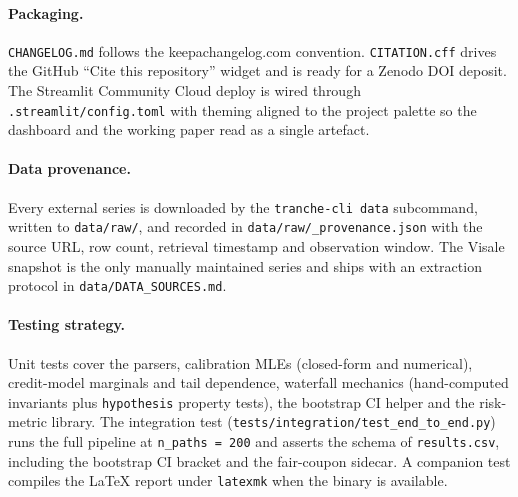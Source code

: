 \paragraph{Packaging.} \texttt{CHANGELOG.md} follows the
keepachangelog.com convention. \texttt{CITATION.cff} drives the GitHub
``Cite this repository'' widget and is ready for a Zenodo DOI deposit.
The Streamlit Community Cloud deploy is wired through
\texttt{.streamlit/config.toml} with theming aligned to the project
palette so the dashboard and the working paper read as a single
artefact.

\paragraph{Data provenance.} Every external series is downloaded by the
\texttt{tranche-cli data} subcommand, written to \texttt{data/raw/}, and
recorded in \texttt{data/raw/\_provenance.json} with the source URL, row
count, retrieval timestamp and observation window. The Visale snapshot
is the only manually maintained series and ships with an extraction
protocol in \texttt{data/DATA\_SOURCES.md}.

\paragraph{Testing strategy.} Unit tests cover the parsers, calibration
MLEs (closed-form and numerical), credit-model marginals and tail
dependence, waterfall mechanics (hand-computed invariants plus
\texttt{hypothesis} property tests), the bootstrap CI helper and the
risk-metric library. The integration test
(\texttt{tests/integration/test\_end\_to\_end.py}) runs the full
pipeline at \texttt{n\_paths = 200} and asserts the schema of
\texttt{results.csv}, including the bootstrap CI bracket and the
fair-coupon sidecar. A companion test compiles the \LaTeX{} report
under \texttt{latexmk} when the binary is available.
